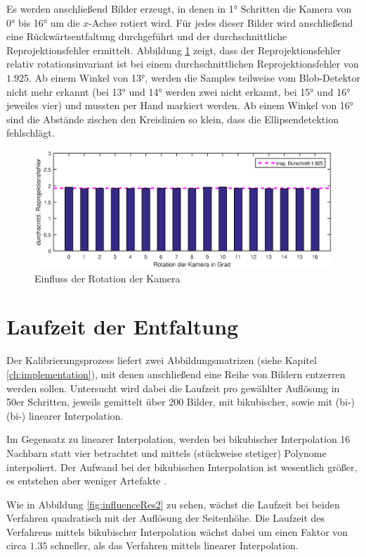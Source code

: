 Es werden anschließend Bilder erzeugt, in denen in 1° Schritten die Kamera von 0° bis 16° um die $x$-Achse rotiert wird. Für jedes dieser Bilder wird anschließend eine Rückwärtsentfaltung durchgeführt und der durchschnittliche Reprojektionsfehler ermittelt. Abbildung \ref{fig:influenceRot} zeigt, dass der Reprojektionsfehler relativ rotationsinvariant ist bei einem durchschnittlichen Reprojektionsfehler von $1.925$. Ab einem Winkel von  13°, werden die Samples teilweise vom Blob-Detektor nicht mehr erkannt (bei 13° und 14° werden zwei nicht erkannt, bei 15° und 16° jeweiles vier) und mussten per Hand markiert werden. Ab einem Winkel von 16° sind die Abstände zischen den Kreislinien so klein, dass die Ellipsendetektion fehlschlägt.


\begin{figure}[!htb]
	\centering
	\includegraphics[width=\textwidth]{images/reprojectionErrorDeg3.eps}
	\caption{Einfluss der Rotation der Kamera}
	\label{fig:influenceRot}
\end{figure}


\section{Laufzeit der Entfaltung}
Der Kalibrierungsprozess liefert zwei Abbildungsmatrizen (siehe Kapitel \ref{ch:implementation}), mit denen anschließend eine Reihe von Bildern entzerren werden sollen. Untersucht wird dabei die Laufzeit pro gewählter Auflösung in 50er Schritten, jeweils gemittelt über 200 Bilder, mit bikubischer, sowie mit (bi-) (bi-) linearer Interpolation.

Im Gegensatz zu linearer Interpolation, werden bei bikubischer Interpolation 16 Nachbarn statt vier betrachtet und mittels (stückweise stetiger) Polynome interpoliert. Der Aufwand bei der bikubischen Interpolation ist wesentlich größer, es entstehen aber weniger Artefakte \cite{Keys1981}.

Wie in Abbildung \ref{fig:influenceRes2} zu sehen, wächst die Laufzeit bei beiden Verfahren quadratisch mit der Auflösung der Seitenhöhe. Die Laufzeit des Verfahrens mittels bikubischer Interpolation wächst dabei um einen Faktor von circa $1.35$ schneller, als das Verfahren mittels linearer Interpolation.

